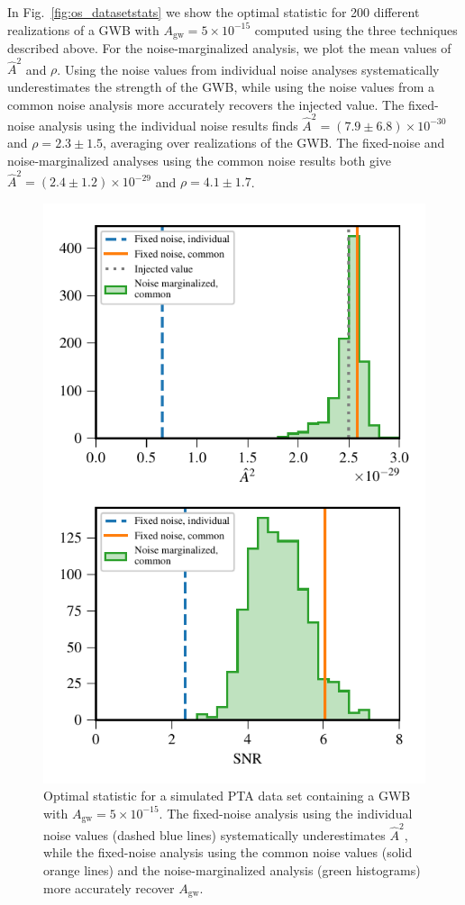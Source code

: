 \documentclass[twocolumn,aps,prd,superscriptaddress]{revtex4-1}
\newcommand{\Agw}{\ensuremath{A_\mathrm{gw}}}
\begin{document}
In Fig.~\ref{fig:os_datasetstats} we show the optimal statistic 
for 200 different realizations of a GWB with $\Agw = 5\times10^{-15}$ 
computed using the three techniques described above. 
For the noise-marginalized analysis, we plot 
the mean values of $\hat{A}^2$ and $\rho$. 
Using the noise values from individual noise analyses 
systematically underestimates the strength of the GWB, 
while using the noise values from a common noise analysis 
more accurately recovers the injected value. 
The fixed-noise analysis using the individual noise results finds 
$\hat{A}^2 = (7.9 \pm 6.8) \times10^{-30}$ and $\rho = 2.3 \pm 1.5$, 
averaging over realizations of the GWB. 
The fixed-noise and noise-marginalized analyses 
using the common noise results both give 
$\hat{A}^2 = (2.4\pm1.2)\times10^{-29}$ and $\rho = 4.1 \pm 1.7$.

\begin{figure}[tb]
	\includegraphics[width=0.9\columnwidth]{plots/optstat_A5e-15_dataset11.pdf}
	\caption{Optimal statistic 
			for a simulated PTA data set containing a GWB with $\Agw = 5\times10^{-15}$. 
			The fixed-noise analysis using the individual noise values (dashed blue lines) 
			systematically underestimates $\hat{A}^2$, while the 
			fixed-noise analysis using the common noise values (solid orange lines) 
			and the noise-marginalized analysis (green histograms) 
			more accurately recover $\Agw$.}
	\label{fig:os_dataset_sample}
\end{figure}
\end{document}
